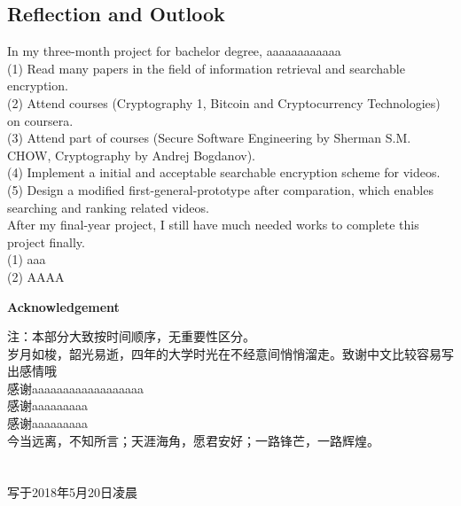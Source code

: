\documentclass[a4paper,12pt,UTF8]{ctexart}
\begin{document}
\begin{spacing}{1.1}
\subsection{Reflection and Outlook}
In my three-month project for bachelor degree, aaaaaaaaaaaa
\\\indent(1) Read many papers in the field of information retrieval and searchable encryption.
\\\indent(2) Attend courses (Cryptography 1, Bitcoin and Cryptocurrency Technologies) on coursera.
\\\indent(3) Attend part of courses (Secure Software Engineering by Sherman S.M. CHOW, Cryptography by Andrej Bogdanov).
\\\indent(4) Implement a initial and acceptable searchable encryption scheme for videos.
\\\indent(5) Design a modified first-general-prototype after comparation, which enables searching and ranking related videos. 
\\\indent After my final-year project, I still have much needed works to complete this project finally. 
\\\indent(1) aaa
\\\indent(2) AAAA
\end{spacing}
\clearpage
\indent
\clearpage
\begin{spacing}{1.1}
	\newpage
	\small
	
	
\end{spacing}
\clearpage
\indent
\clearpage
{}
\begin{center}
	\LARGE\textbf{Acknowledgement} 
\end{center}
\normalsize
\begin{spacing}{1.35}
注：本部分大致按时间顺序，无重要性区分。
\\\indent 岁月如梭，韶光易逝，四年的大学时光在不经意间悄悄溜走。致谢中文比较容易写出感情哦~
\\\indent 感谢aaaaaaaaaaaaaaaaaa
\\\indent 感谢aaaaaaaaa
\\\indent 感谢aaaaaaaaa
\\\indent 今当远离，不知所言；天涯海角，愿君安好；一路锋芒，一路辉煌。
\\
\\
\\\indent\indent\indent\indent\indent\indent\indent\indent\indent\indent\indent\indent 写于2018年5月20日凌晨
\end{spacing}
\end{document}
